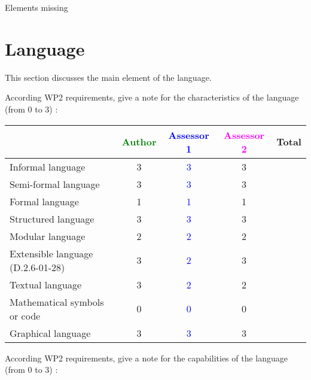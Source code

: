 \begin{assessor2}
Elements missing
\end{assessor2}


\section{Language}
This section discusses the main element of the language.

According WP2 requirements, give a note for the characteristics of the language (from 0 to 3) :

\begin{tabular}{|l | c | c | c | c|}
\hline
& \textcolor{green}{Author} & \textcolor{blue}{Assessor 1} & \textcolor{magenta}{Assessor 2} & Total \\
\hline
Informal language & 3 & \textcolor{blue}{3} & 3 & \\
\hline
Semi-formal language & 3 & \textcolor{blue}{3} & 3 & \\
\hline
Formal language & 1 & \textcolor{blue}{1} & 1 & \\
\hline
Structured language & 3 & \textcolor{blue}{3} & 3 & \\
\hline
Modular language & 2 & \textcolor{blue}{2} & 2 & \\
\hline
Extensible language (D.2.6-01-28) & 3 & \textcolor{blue}{2} & 3 & \\
\hline
Textual language & 3 & \textcolor{blue}{2} & 2 & \\
\hline
Mathematical symbols or code & 0 & \textcolor{blue}{0} & 0  & \\
\hline
Graphical language & 3 & \textcolor{blue}{3} & 3 & \\
\hline
\end{tabular}

According WP2 requirements, give a note for the capabilities of the language (from 0 to 3) :

